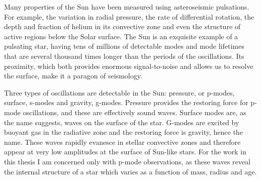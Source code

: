 Many properties of the Sun have been measured using asteroseismic pulsations.
For example, the variation in radial pressure, the rate of differential
rotation, the depth and fraction of helium in its convective zone and even the
structure of active regions below the Solar surface.
The Sun is an exquisite example of a pulsating star, having tens of millions
of detectable modes and mode lifetimes that are several thousand times longer
than the periods of the oscillations.
Its proximity, which both provides enormous signal-to-noise and allows us to
resolve the surface, make it a paragon of seismology.

Three types of oscillations are detectable in the Sun: pressure, or p-modes,
surface, s-modes and gravity, g-modes.
Pressure provides the restoring force for p-mode oscillations, and these are
effectively sound waves.
Surface modes are, as the name suggests, waves on the surface of the star.
G-modes are excited by buoyant gas in the radiative zone and the restoring
force is gravity, hence the name.
These waves rapidly evanesce in stellar convective zones and therefore
appear at very low amplitudes at the surface of Sun-like stars.
For the work in this thesis I am concerned only with p-mode observations, as
these waves reveal the internal structure of a star which varies as a function
of mass, radius and age.

